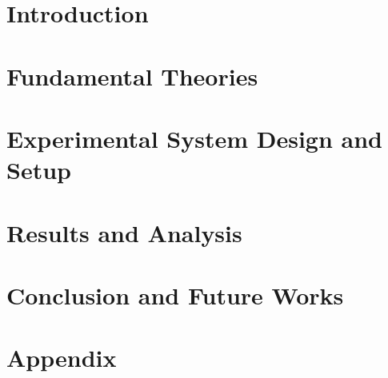 \documentclass[12pt,english]{report}
\begin{document}
\tableofcontents

\listoffigures

\listoftables

%

\newpage
{}

\chapter{Introduction}


\chapter{Fundamental Theories}


\chapter{Experimental System Design and Setup}


\chapter{Results and Analysis}


\chapter{Conclusion and Future Works}


\printbibliography[heading=bibintoc,title=References]

\chapter*{Appendix}

\end{document}
